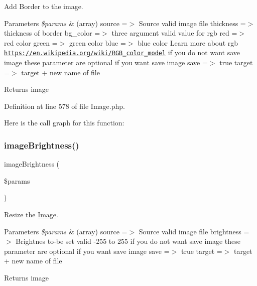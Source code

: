 Add Border to the image.


\begin{DoxyParams}{Parameters}
{\em \$params} & (array) \textquotesingle{}source\textquotesingle{} =$>$ Source valid image file \textquotesingle{}thickness\textquotesingle{} =$>$ thickness of border \textquotesingle{}bg\+\_\+color\textquotesingle{} =$>$ three argument valid value for rgb \textquotesingle{}red\textquotesingle{} =$>$ red color \textquotesingle{}green\textquotesingle{} =$>$ green color \textquotesingle{}blue\textquotesingle{} =$>$ blue color Learn more about rgb \href{https://en.wikipedia.org/wiki/RGB_color_model}{\tt https\+://en.\+wikipedia.\+org/wiki/\+R\+G\+B\+\_\+color\+\_\+model} if you do not want save image these parameter are optional if you want save image \textquotesingle{}save\textquotesingle{} =$>$ true \textquotesingle{}target\textquotesingle{} =$>$ target + new name of file\\
\hline
\end{DoxyParams}
\begin{DoxyReturn}{Returns}
image 
\end{DoxyReturn}


Definition at line 578 of file Image.\+php.

Here is the call graph for this function\+:
\mbox{\label{class_zest_1_1_image_1_1_image_a57af33285ab49538a532b0891bc28794}} 
\subsubsection{\texorpdfstring{image\+Brightness()}{imageBrightness()}}
{\footnotesize\ttfamily image\+Brightness (\begin{DoxyParamCaption}\item[{}]{\$params }\end{DoxyParamCaption})}

Resize the \mbox{\hyperlink{class_zest_1_1_image_1_1_image}{Image}}.


\begin{DoxyParams}{Parameters}
{\em \$params} & (array) \textquotesingle{}source\textquotesingle{} =$>$ Source valid image file \textquotesingle{}brightness\textquotesingle{} =$>$ Brightnes to-\/be set valid -\/255 to 255 if you do not want save image these parameter are optional if you want save image \textquotesingle{}save\textquotesingle{} =$>$ true \textquotesingle{}target\textquotesingle{} =$>$ target + new name of file\\
\hline
\end{DoxyParams}
\begin{DoxyReturn}{Returns}
image 
\end{DoxyReturn}


